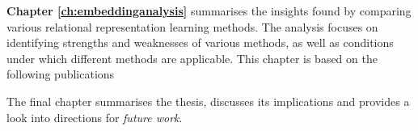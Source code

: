 \begin{quote}
\end{quote}

\begin{quote}
\end{quote}

\begin{quote}
\end{quote}


\textbf{Chapter \ref{ch:embeddinganalysis}} summarises the insights found by comparing various relational representation learning methods.
The analysis focuses on identifying strengths and weaknesses of various methods, as well as conditions under which different methods are applicable.
This chapter is based on the following publications

\begin{quote}
\end{quote}

\begin{quote}
\end{quote}


The final chapter summarises the thesis, discusses its implications and provides a look into directions for \textit{future work}.







\cleardoublepage

 